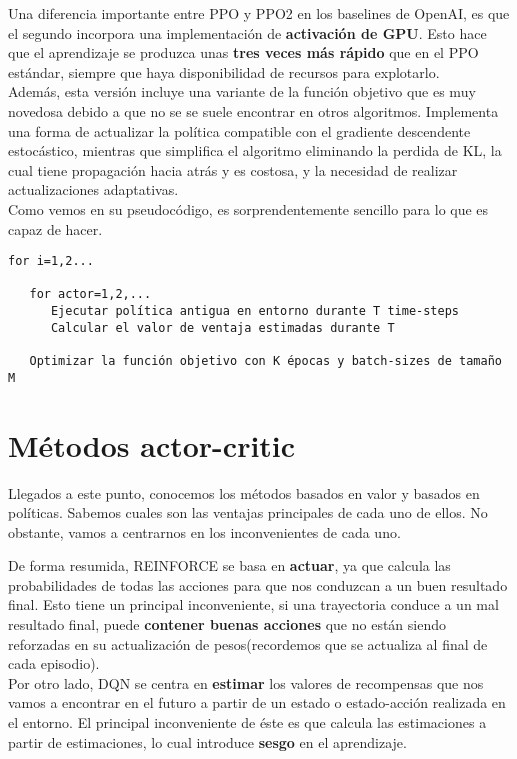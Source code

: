 \documentclass[11pt,fleqn]{book} %
\begin{document}
Una diferencia importante entre PPO y PPO2 en los baselines de OpenAI, es que el segundo incorpora una implementación de \textbf{activación de GPU}. Esto hace que el aprendizaje se produzca unas \textbf{tres veces más rápido} que en el PPO estándar, siempre que haya disponibilidad de recursos para explotarlo. \\

Además, esta versión incluye una variante de la función objetivo que es muy novedosa debido a que no se se suele encontrar en otros algoritmos. Implementa una forma de actualizar la política compatible con el gradiente descendente estocástico, mientras que simplifica el algoritmo eliminando la perdida de KL, la cual tiene propagación hacia atrás y es costosa, y la necesidad de realizar actualizaciones adaptativas. \\

Como vemos en su pseudocódigo, es sorprendentemente sencillo para lo que es capaz de hacer. \cite{article:PPO2_1} \cite{article:PPO2}

\begin{verbatim}
for i=1,2... 

   for actor=1,2,...
      Ejecutar política antigua en entorno durante T time-steps
      Calcular el valor de ventaja estimadas durante T
   
   Optimizar la función objetivo con K épocas y batch-sizes de tamaño M
\end{verbatim}

\section{Métodos actor-critic}

Llegados a este punto, conocemos los métodos basados en valor y basados en políticas. Sabemos cuales son las ventajas principales de cada uno de ellos. No obstante, vamos a centrarnos en los inconvenientes de cada uno.

De forma resumida, REINFORCE se basa en \textbf{actuar}, ya que calcula las probabilidades de todas las acciones para que nos conduzcan a un buen resultado final. Esto tiene un principal inconveniente, si una trayectoria conduce a un mal resultado final, puede \textbf{contener buenas acciones} que no están siendo reforzadas en su actualización de pesos(recordemos que se actualiza al final de cada episodio). \\

Por otro lado, DQN se centra en \textbf{estimar} los valores de recompensas que nos vamos a encontrar en el futuro a partir de un estado o estado-acción realizada en el entorno. El principal inconveniente de éste es que calcula las estimaciones a partir de estimaciones, lo cual introduce \textbf{sesgo} en el aprendizaje. \\
\end{document}
